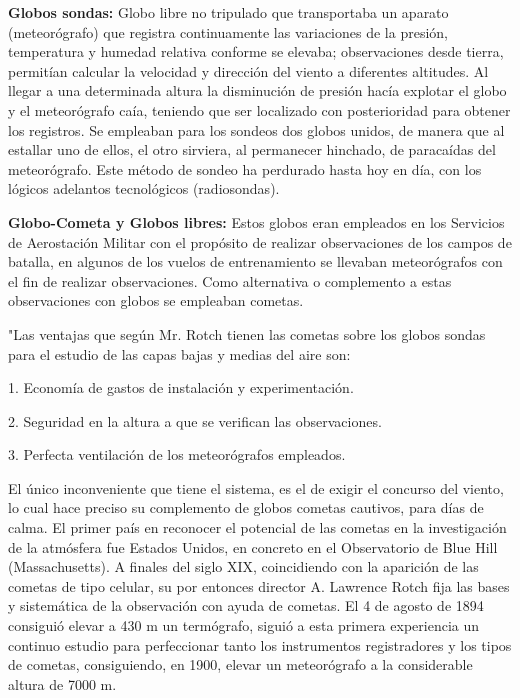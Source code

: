 \documentclass{article} %
\begin{document}
\textbf{Globos sondas:} Globo libre no tripulado que transportaba un aparato (meteorógrafo) que registra continuamente las variaciones de la presión, temperatura y humedad relativa conforme se elevaba; observaciones desde tierra, permitían calcular la velocidad y dirección del viento a diferentes altitudes. Al llegar a una determinada altura la disminución de presión hacía explotar el globo y el meteorógrafo caía, teniendo que ser localizado con posterioridad para obtener los registros. Se empleaban para los sondeos dos globos unidos, de manera que al estallar uno de ellos, el otro sirviera, al permanecer hinchado, de paracaídas del meteorógrafo. Este método de sondeo ha perdurado hasta hoy en día, con los lógicos adelantos tecnológicos (radiosondas).
\vspace{0.5 cm}

\textbf{Globo-Cometa y Globos libres:} Estos globos eran empleados en los Servicios de Aerostación Militar con el propósito de realizar observaciones de los campos de batalla, en algunos de los vuelos de entrenamiento se llevaban meteorógrafos con el fin de realizar observaciones. Como alternativa o complemento a estas observaciones con globos se empleaban cometas.
\vspace{0.5 cm}

"Las ventajas que según Mr. Rotch tienen las cometas sobre los globos sondas para el estudio de las capas bajas y medias del aire son:
\vspace{0.5 cm}

1. Economía de gastos de instalación y experimentación.
\vspace{0.5 cm}

2. Seguridad en la altura a que se verifican las observaciones.
\vspace{0.5 cm}

3. Perfecta ventilación de los meteorógrafos empleados.
\vspace{0.5 cm}

El único inconveniente que tiene el sistema, es el de exigir el concurso del viento, lo cual hace preciso su complemento de globos cometas cautivos, para días de calma. El primer país en reconocer el potencial de las cometas en la investigación de la atmósfera fue Estados Unidos, en concreto en el Observatorio de Blue Hill (Massachusetts). A finales del siglo XIX, coincidiendo con la aparición de las cometas de tipo celular, su por entonces director A. Lawrence Rotch fija las bases y sistemática de la observación con ayuda de cometas. El 4 de agosto de 1894 consiguió elevar a 430 m un termógrafo, siguió a esta primera experiencia un continuo estudio para perfeccionar tanto los instrumentos registradores y los tipos de cometas, consiguiendo, en 1900, elevar un meteorógrafo a la considerable altura de 7000 m.
\vspace{0.5 cm}
\end{document}
